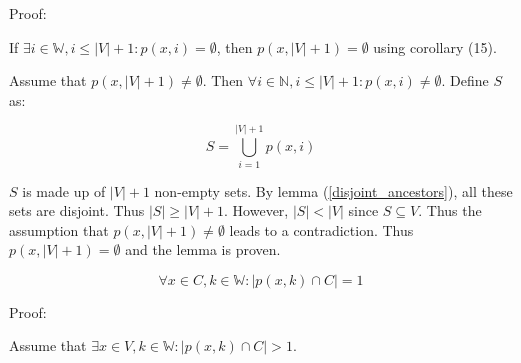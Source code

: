 \documentclass[11pt]{article}
\begin{document}
    Proof:

    If $\exists i\in \mathbb{W},i\leq |V|+1: p(x,i)=\emptyset$, then $p(x,|V|+1)=\emptyset$ using corollary (15).

    Assume that $p(x,|V|+1) \not = \emptyset$. Then $\forall i \in \mathbb{N}, i\leq |V|+1: p(x,i) \not = \emptyset$. Define $S$ as:


    \begin{equation*}
        S = \bigcup_{i=1}^{|V|+1}p(x,i)
    \end{equation*}

    $S$ is made up of $|V|+1$ non-empty sets. By lemma (\ref{disjoint_ancestors}), all these sets are disjoint. Thus $|S|\geq|V|+1$. However, $|S|<|V|$ since $S \subseteq V$. Thus the assumption that $p(x,|V|+1) \not = \emptyset$ leads to a contradiction. Thus $p(x,|V|+1) = \emptyset$ and the lemma is proven.

    \begin{equation}
        \forall x \in C, k \in \mathbb{W}: |p(x,k) \cap C|=1
        \label{unique_parent_in_ring}
    \end{equation}

    Proof:

    Assume that $\exists x \in V,k \in \mathbb{W}: |p(x,k) \cap C|>1$.
\end{document}
